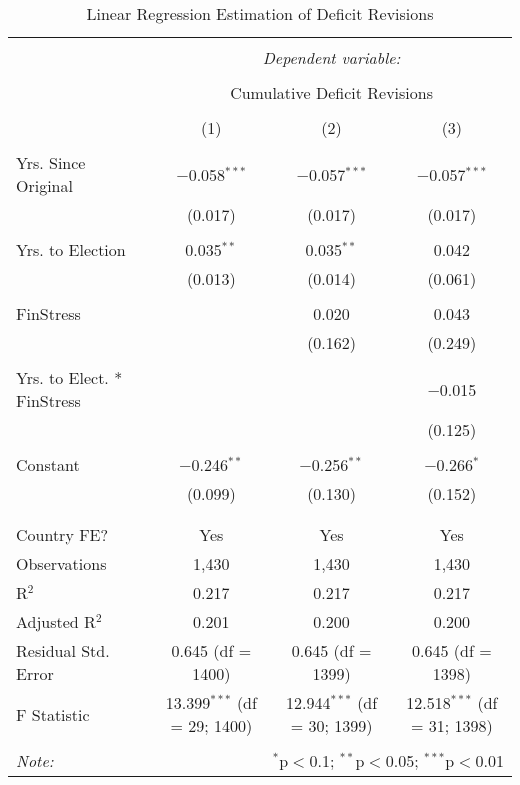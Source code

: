 
\begin{table}[!htbp] \centering 
  \caption{Linear Regression Estimation of Deficit Revisions} 
  \label{deficit_results} 
\footnotesize 
\begin{tabular}{@{\extracolsep{5pt}}lccc} 
\\[-1.8ex]\hline 
\hline \\[-1.8ex] 
 & \multicolumn{3}{c}{\textit{Dependent variable:}} \\ 
\cline{2-4} 
\\[-1.8ex] & \multicolumn{3}{c}{Cumulative Deficit Revisions} \\ 
\\[-1.8ex] & (1) & (2) & (3)\\ 
\hline \\[-1.8ex] 
 Yrs. Since Original & $-$0.058$^{***}$ & $-$0.057$^{***}$ & $-$0.057$^{***}$ \\ 
  & (0.017) & (0.017) & (0.017) \\ 
  & & & \\ 
 Yrs. to Election & 0.035$^{**}$ & 0.035$^{**}$ & 0.042 \\ 
  & (0.013) & (0.014) & (0.061) \\ 
  & & & \\ 
 FinStress &  & 0.020 & 0.043 \\ 
  &  & (0.162) & (0.249) \\ 
  & & & \\ 
 Yrs. to Elect. * FinStress &  &  & $-$0.015 \\ 
  &  &  & (0.125) \\ 
  & & & \\ 
 Constant & $-$0.246$^{**}$ & $-$0.256$^{**}$ & $-$0.266$^{*}$ \\ 
  & (0.099) & (0.130) & (0.152) \\ 
  & & & \\ 
\hline \\[-1.8ex] 
Country FE? & Yes & Yes & Yes \\ 
Observations & 1,430 & 1,430 & 1,430 \\ 
R$^{2}$ & 0.217 & 0.217 & 0.217 \\ 
Adjusted R$^{2}$ & 0.201 & 0.200 & 0.200 \\ 
Residual Std. Error & 0.645 (df = 1400) & 0.645 (df = 1399) & 0.645 (df = 1398) \\ 
F Statistic & 13.399$^{***}$ (df = 29; 1400) & 12.944$^{***}$ (df = 30; 1399) & 12.518$^{***}$ (df = 31; 1398) \\ 
\hline 
\hline \\[-1.8ex] 
\textit{Note:}  & \multicolumn{3}{r}{$^{*}$p$<$0.1; $^{**}$p$<$0.05; $^{***}$p$<$0.01} \\ 
\end{tabular} 
\end{table} 
